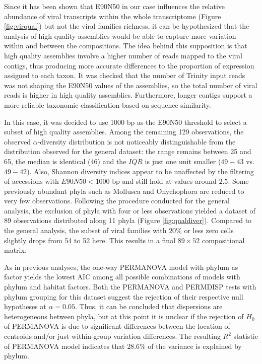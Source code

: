 \documentclass[
  openany]{book}
\begin{document}
Since it has been shown that E90N50 in our case influences the relative abundance of viral transcripts within the whole transcriptome (Figure \ref{fig:virqual}) but not the viral families richness, it can be hypothesized that the analysis of high quality assemblies would be able to capture more variation within and between the compositions. The idea behind this supposition is that high quality assemblies involve a higher number of reads mapped to the viral contigs, thus producing more accurate differences to the proportion of expression assigned to each taxon. It was checked that the number of Trinity input reads was not shaping the E90N50 values of the assemblies, so the total number of viral reads is higher in high quality assemblies. Furthermore, longer contigs support a more reliable taxonomic classification based on sequence similarity.

In this case, it was decided to use 1000 bp as the E90N50 threshold to select a subset of high quality assemblies. Among the remaining 129 observations, the observed \(\alpha\)-diversity distribution is not noticeably distinguishable from the distribution observed for the general dataset: the range remains between 25 and 65, the median is identical (46) and the \(IQR\) is just one unit smaller (\(49 - 43\) vs.~\(49 - 42\)). Also, Shannon diversity indices appear to be unaffected by the filtering of accessions with \(E90N50 < 1000\) bp and still hold at values around \(2.5\). Some previously abundant phyla such as Mollusca and Onychophora are reduced to very few observations. Following the procedure conducted for the general analysis, the exclusion of phyla with four or less observations yielded a dataset of 89 observations distributed along 11 phyla (Figure \ref{fig:qualdiver}). Compared to the general analysis, the subset of viral families with \(20\%\) or less zero cells slightly drops from 54 to 52 here. This results in a final \(89 \times 52\) compositional matrix.

As in previous analyses, the one-way PERMANOVA model with phylum as factor yields the lowest AIC among all possible combinations of models with phylum and habitat factors. Both the PERMANOVA and PERMDISP tests with phylum grouping for this dataset suggest the rejection of their respective null hypotheses at \(\alpha = 0.05\). Thus, it can be concluded that dispersions are heterogeneous between phyla, but at this point it is unclear if the rejection of \(H_0\) of PERMANOVA is due to significant differences between the location of centroids and/or just within-group variation differences. The resulting \(R^2\) statistic of PERMANOVA model indicates that \(28.6\%\) of the variance is explained by phylum.
\end{document}
